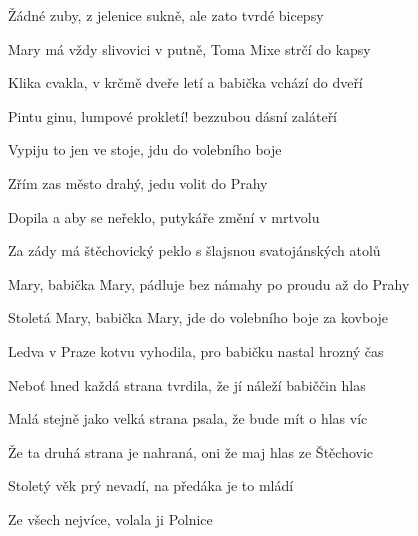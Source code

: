 \begin{song}
\bigskip

Žádné zuby, z jelenice sukně, ale zato tvrdé bicepsy \par
{}Mary má vždy slivovici v putně, Toma Mixe strčí do kapsy \par
{}Klika cvakla, v krčmě dveře letí a babička vchází do dveří \par
{}Pintu ginu, lumpové prokletí! bezzubou dásní zaláteří \par

\bigskip

Vypiju to jen ve stoje, jdu do volebního boje \par
{}Zřím zas město drahý, jedu volit do Prahy \par

\bigskip

Dopila a aby se neřeklo, putykáře změní v mrtvolu \par
{}Za zády má štěchovický peklo s šlajsnou svatojánských atolů \par
{} \par

\bigskip

Mary, babička Mary, pádluje bez námahy po proudu až do Prahy  \par
Stoletá Mary, babička Mary, jde do volebního boje za kovboje  \par

\bigskip

Ledva v Praze kotvu vyhodila, pro babičku nastal hrozný čas \par
{}Neboť hned každá strana tvrdila, že jí náleží babiččin hlas \par
{}Malá stejně jako velká strana psala, že bude mít o hlas víc \par
{}Že ta druhá strana je nahraná, oni že maj hlas ze Štěchovic \par

\bigskip

Stoletý věk prý nevadí, na předáka je to mládí \par
{}Ze všech nejvíce, volala ji Polnice \par


\end{song}
